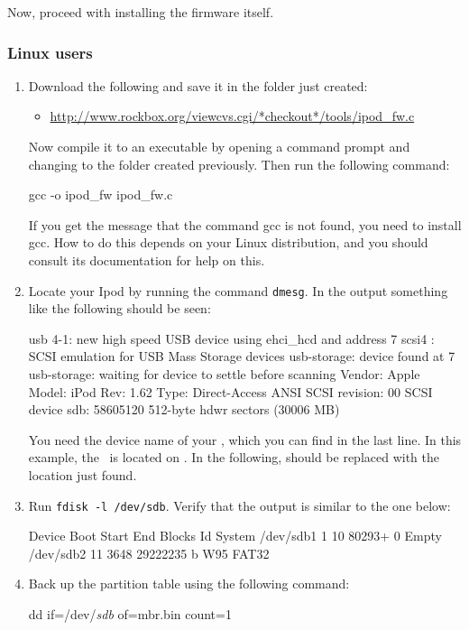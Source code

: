 Now, proceed with installing the firmware itself.

\subsubsection{Linux users}
\begin{enumerate}
  \item Download the following and save it in the folder just
    created:
    \begin{itemize}
      \item \url{http://www.rockbox.org/viewcvs.cgi/*checkout*/tools/ipod_fw.c}
    \end{itemize}
    Now compile it to an executable by opening a command prompt and changing
    to the folder created previously. Then run the following command:
    \begin{code}
    gcc -o ipod_fw ipod_fw.c
    \end{code}
    If you get the message that the command gcc is not found, you need to
    install gcc. How to do this depends on your Linux distribution, and
    you should consult its documentation for help on this.
  \item Locate your Ipod by running the command \verb|dmesg|. In the output
    something like the following should be seen:
\begin{code}
    usb 4-1: new high speed USB device using ehci_hcd and address 7
    scsi4 : SCSI emulation for USB Mass Storage devices
    usb-storage: device found at 7
    usb-storage: waiting for device to settle before scanning
      Vendor: Apple     Model: iPod              Rev: 1.62
      Type:   Direct-Access                      ANSI SCSI revision: 00
    SCSI device sdb: 58605120 512-byte hdwr sectors (30006 MB)
\end{code}
    You need the device name of your \dap, which you can find in the last line.
    In this example, the \dap\ is located on . In the following,
     should be replaced with the location just found.
  \item Run \verb|fdisk -l /dev/sdb|. Verify that the
    output is similar to the one below:
    \begin{code}
       Device Boot      Start         End      Blocks   Id  System
    /dev/sdb1               1          10       80293+   0  Empty
    /dev/sdb2              11        3648    29222235    b  W95 FAT32
    \end{code}
  \item Back up the partition table using the following command:
    \begin{code}
    dd if=/dev/\emph{sdb} of=mbr.bin count=1
    \end{code}


\end{enumerate}
